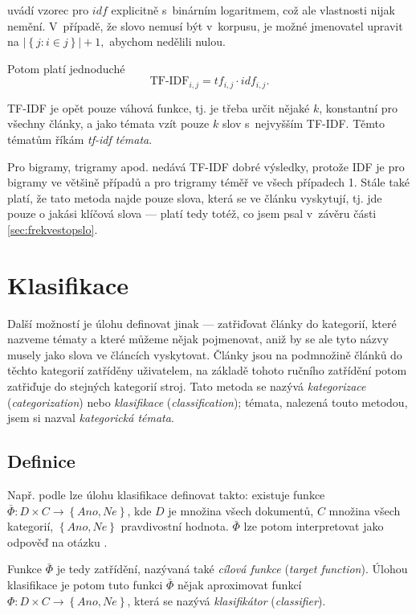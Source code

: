\documentclass[12pt,a4paper]{report}
\begin{document}
\cite{introduction} uvádí vzorec pro $idf$ explicitně s~binárním logaritmem, což ale vlastnosti nijak nemění. V~případě, že slovo nemusí být v~korpusu, je možné jmenovatel upravit na $\left|\left\{j: i \in j\right\}\right|+1,$ abychom nedělili nulou.

Potom platí jednoduché $$\mbox{TF-IDF}_{i,j}=tf_{i,j}\cdot idf_{i,j}.$$

TF-IDF je opět pouze váhová funkce, tj. je třeba určit nějaké $k$, konstantní pro všechny články, a jako témata vzít pouze  $k$ slov s~nejvyšším TF-IDF. Těmto tématům říkám \emph{tf-idf témata}.

Pro bigramy, trigramy apod. nedává TF-IDF dobré výsledky, protože IDF je pro bigramy ve většině případů a pro trigramy téměř ve všech případech 1. Stále také platí, že tato metoda najde pouze slova, která se ve článku vyskytují, tj. jde pouze o jakási klíčová slova --- platí tedy totéž, co jsem psal v~závěru části \ref{sec:frekvestopslo}.

\section{Klasifikace}
\label{sec:kategorizace}
Další možností je úlohu definovat jinak --- zatřiďovat články do kategorií, které nazveme tématy a které můžeme nějak pojmenovat, aniž by se ale tyto názvy musely jako slova ve článcích vyskytovat. Články jsou na podmnožině článků do těchto kategorií zatříděny uživatelem, na základě tohoto ručního zatřídění potom zatřiďuje do stejných kategorií stroj. Tato metoda se nazývá \emph{kategorizace} (\emph{categorization}) nebo \emph{klasifikace} (\emph{classification}); témata, nalezená touto metodou, jsem si nazval \emph{kategorická témata}.

\subsection{Definice}
 \label{sec:kategorizace_def}
Např. podle \cite{machine_intro} lze úlohu klasifikace definovat takto: existuje funkce $\bar{\Phi}: D \times C \rightarrow \left\{Ano, Ne\right\}$, kde $D$ je množina všech dokumentů, $C$ množina všech kategorií, $\left\{Ano, Ne\right\}$ pravdivostní hodnota. $\bar{\Phi}$ lze potom interpretovat jako odpověď na otázku .

Funkce $\bar{\Phi}$ je tedy  zatřídění, nazývaná také \emph{cílová funkce} (\emph{target function}). Úlohou klasifikace je potom tuto funkci $\bar{\Phi}$ nějak aproximovat funkcí $\Phi: D \times C \rightarrow \left\{Ano, Ne\right\}$, která se nazývá \emph{klasifikátor} (\emph{classifier}).
\end{document}
